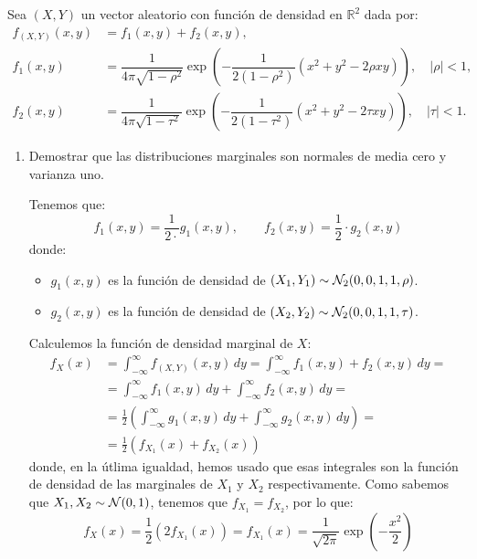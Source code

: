 \begin{ejercicio}
    Sea $(X,Y)$ un vector aleatorio con función de densidad en $\mathbb{R}^2$ dada por:
    \begin{align*}
        f_{(X,Y)}(x, y) &= f_1(x, y) + f_2(x, y),\\
        f_1(x, y) &= \dfrac{1}{4\pi\sqrt{1-\rho^2}}\exp\left(-\dfrac{1}{2(1-\rho^2)}(x^2 +y^2 -2\rho xy)\right),\quad |\rho| < 1,\\
        f_2(x, y) &= \dfrac{1}{4\pi\sqrt{1-\tau^2}}\exp\left(-\dfrac{1}{2(1-\tau^2)}(x^2 +y^2 -2\tau xy)\right),\quad |\tau| < 1.
    \end{align*}
    
    \begin{enumerate}
        \item Demostrar que las distribuciones marginales son normales de media cero y varianza uno.
        
        Tenemos que:
        \begin{equation*}
            f_1(x,y)=\frac{1}{2\cdot }g_1(x,y),\qquad
            f_2(x,y)=\frac{1}{2}\cdot g_2(x,y)
        \end{equation*}
        donde:
        \begin{itemize}
            \item $g_1(x,y)$ es la función de densidad de $(X_1,Y_1)\sim \mathcal{N}_2(0,0,1,1,\rho)$.
            \item $g_2(x,y)$ es la función de densidad de $(X_2,Y_2)\sim \mathcal{N}_2(0,0,1,1,\tau)$.
        \end{itemize}

        Calculemos la función de densidad marginal de $X$:
        \begin{align*}
            f_X(x) &= \int_{-\infty}^\infty f_{(X,Y)}(x,y)\,dy = \int_{-\infty}^\infty f_1(x,y) + f_2(x,y)\,dy =\\
            &= \int_{-\infty}^\infty f_1(x,y)\,dy + \int_{-\infty}^\infty f_2(x,y)\,dy
            =\\&= \frac{1}{2}\left(\int_{-\infty}^\infty g_1(x,y)\,dy + \int_{-\infty}^\infty g_2(x,y)\,dy\right)
            =\\&= \frac{1}{2}\left(f_{X_1}(x) + f_{X_2}(x)\right)
        \end{align*}
        donde, en la útlima igualdad, hemos usado que esas integrales son la función de densidad de las marginales de $X_1$ y $X_2$ respectivamente. Como sabemos que $X_1,X_2\sim \mathcal{N}(0,1)$, tenemos que $f_{X_1}=f_{X_2}$, por lo que:
        \begin{equation*}
            f_X(x) = \frac{1}{2}\left(2f_{X_1}(x)\right) = f_{X_1}(x) = \frac{1}{\sqrt{2\pi}}\exp\left(-\frac{x^2}{2}\right)
        \end{equation*}


\end{enumerate}
\end{ejercicio}
